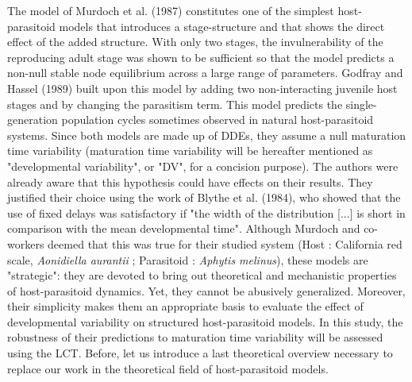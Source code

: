 \documentclass[12pt,a4paper,onecolumn]{article}
\begin{document}
\tabto{1 cm} The model of Murdoch et al. (1987) constitutes one of the simplest host-parasitoid models that introduces a stage-structure and that shows the direct effect of the added structure. With only two stages, the invulnerability of the reproducing adult stage was shown to be sufficient so that the model predicts a non-null stable node equilibrium across a large range of parameters.  Godfray and Hassel (1989) built upon this model by adding two non-interacting juvenile host stages and by changing the parasitism term. This model predicts the single-generation population cycles sometimes observed in natural host-parasitoid systems. Since both models are made up of DDEs, they assume a null maturation time variability (maturation time variability will be hereafter mentioned as "developmental variability", or "DV", for a concision purpose). The authors were already aware that this hypothesis could have effects on their results. They justified their choice using the work of Blythe et al. (1984), who showed that the use of fixed delays was satisfactory if "the width of the distribution [...] is short in comparison with the mean developmental time".  Although Murdoch and co-workers deemed that this was true for their studied system (Host : California red scale, \textit{Aonidiella aurantii} ; Parasitoid : \textit{Aphytis melinus}), these models are "strategic": they are devoted to bring out theoretical and mechanistic properties of host-parasitoid dynamics. Yet, they cannot be abusively generalized. Moreover, their simplicity makes them an appropriate basis to evaluate the effect of developmental variability on structured host-parasitoid models. In this study, the robustness of their predictions to maturation time variability will be assessed using the LCT. Before, let us introduce a last theoretical overview necessary to replace our work in the theoretical field of host-parasitoid models. \\
\end{document}

